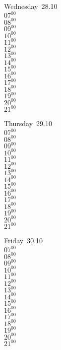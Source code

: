 \documentclass[11pt,a4paper]{book}\usepackage[]{graphicx}\usepackage[]{color}
\begin{document}
\begin{weekdaybox}
  Wednesday~28.10\\
  { 
  \vfill
  $07^{00}$\\
$08^{00}$\\
$09^{00}$\\
$10^{00}$\\
$11^{00}$\\
$12^{00}$\\
$13^{00}$\\
$14^{00}$\\
$15^{00}$\\
$16^{00}$\\
$17^{00}$\\
$18^{00}$\\
$19^{00}$\\
$20^{00}$\\
$21^{00}$\\
  }
\end{weekdaybox}
\clearpage
\begin{headerbox}
\end{headerbox}
\begin{weekdaybox}
  Thursday~29.10\\
  { 
  \vfill
  $07^{00}$\\
$08^{00}$\\
$09^{00}$\\
$10^{00}$\\
$11^{00}$\\
$12^{00}$\\
$13^{00}$\\
$14^{00}$\\
$15^{00}$\\
$16^{00}$\\
$17^{00}$\\
$18^{00}$\\
$19^{00}$\\
$20^{00}$\\
$21^{00}$\\
  }
\end{weekdaybox} 
\begin{weekdaybox}
  Friday~30.10\\
  { 
  \vfill
  $07^{00}$\\
$08^{00}$\\
$09^{00}$\\
$10^{00}$\\
$11^{00}$\\
$12^{00}$\\
$13^{00}$\\
$14^{00}$\\
$15^{00}$\\
$16^{00}$\\
$17^{00}$\\
$18^{00}$\\
$19^{00}$\\
$20^{00}$\\
$21^{00}$\\
  }
\end{weekdaybox}
\end{document}
